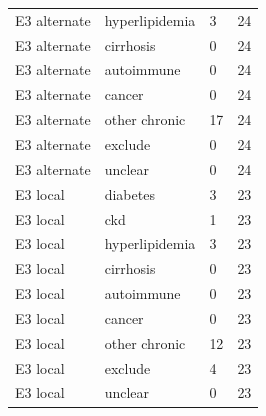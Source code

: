 \begin{tabular}{llll}
E3 alternate & hyperlipidemia & 3 & 24 \\[3pt]
E3 alternate & cirrhosis & 0 & 24 \\[3pt]
E3 alternate & autoimmune & 0 & 24 \\[3pt]
E3 alternate & cancer & 0 & 24 \\[3pt]
E3 alternate & other chronic & 17 & 24 \\[3pt]
E3 alternate & exclude & 0 & 24 \\[3pt]
E3 alternate & unclear & 0 & 24 \\[3pt]
E3 local & diabetes & 3 & 23 \\[3pt]
E3 local & ckd & 1 & 23 \\[3pt]
E3 local & hyperlipidemia & 3 & 23 \\[3pt]
E3 local & cirrhosis & 0 & 23 \\[3pt]
E3 local & autoimmune & 0 & 23 \\[3pt]
E3 local & cancer & 0 & 23 \\[3pt]
E3 local & other chronic & 12 & 23 \\[3pt]
E3 local & exclude & 4 & 23 \\[3pt]
E3 local & unclear & 0 & 23 \\[3pt]
\hline
\end{tabular}
